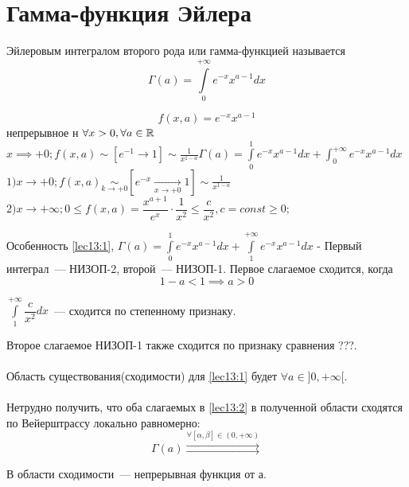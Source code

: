 \documentclass[../../main.tex]{subfiles}
\begin{document}

\section{Гамма-функция Эйлера}

Эйлеровым интегралом второго рода или гамма-функцией называется
\begin{equation}
\label{lec13:1}
\Gamma(a) = \int\limits_0^{+\infty}e^{-x}x^{a-1}dx
\end{equation}

\[
	f(x, a) = e^{-x}x^{a-1}
\]  непрерывное н $\forall x > 0, \forall a \in \mathbb{R}$
\\
$
	x \implies +0; f(x, a) \sim [e^{-1} \to 1] \sim \frac{1}{x^{1-a}}
	\Gamma(a) = \int\limits_0^1e^{-x}x^{a-1}dx + \int_0^{+\infty}e^{-x}x^{a-1}dx
$
\\
$
1) x \to + 0; f(x, a) \underset{k \to +0}\sim \left[ e^{-x} 
\underset{x \to +0} \to 1 \right] \sim \frac{1}{x^{1-a}}
$
\\
$
	2) x \to +\infty; 
	0 \le f(x, a) = \dfrac{x^{a+1}}{e^x} \cdot \dfrac{1}{x^2} \le \dfrac{c}{x^2}, 
	c=const \ge 0;
$

Особенность \eqref{lec13:1}, $\Gamma(a) = \int\limits_0^1 e^{-x} x^{a-1} dx +
\int\limits_1^{+\infty} e^{-x} x^{a-1} dx $ - 
Первый интеграл~--- НИЗОП-2, второй~--- НИЗОП-1. 
Первое слагаемое сходится, когда \begin{equation}
	\label{lec13:2}
	1 - a < 1 \implies a > 0
\end{equation}

$\int\limits_1^{+\infty}\dfrac{c}{x^2}dx$~--- сходится по степенному признаку.

Второе слагаемое НИЗОП-1 также сходится по признаку сравнения ???.
\\\\
Область существования(сходимости) для \eqref{lec13:1} будет $\forall a \in ]0, 
+\infty[$.
\\\\
Нетрудно получить, что оба слагаемых в \eqref{lec13:2} в полученной области 
сходятся по Вейерштрассу локально равномерно:
\[
\Gamma(a) \overset{\forall \left[ \alpha, \beta \right] \in (0, 
+\infty)}{\rightrightarrows}
\]

В области сходимости~--- непрерывная функция от а.
\end{document}
